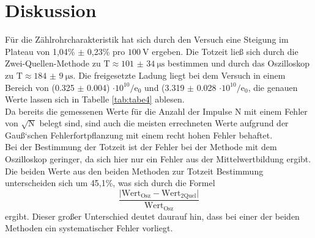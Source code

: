 \section{Diskussion}
\label{sec:Diskussion}
Für die Zählrohrcharakteristik hat sich durch den Versuch eine Steigung im Plateau von
1,04\% $\pm$ 0,23\% pro $\SI{100}{\volt}$ ergeben. Die Totzeit ließ sich durch die
Zwei-Quellen-Methode zu $\text{T} \approx \SI{101(34)}{\micro\second}$ bestimmen und durch
das Oszilloskop zu $\text{T} \approx \SI{184(9)}{\micro\second}$. Die freigesetzte Ladung
liegt bei dem Versuch in einem Bereich von (0.325 $\pm$ 0.004) $\cdot10^{10} / \text{e}_{0}$ und
(3.319 $\pm$ 0.028 $\cdot10^{10} / \text{e}_{0}$, die genauen Werte lassen sich in Tabelle \ref{tab:tabe4}
ablesen. \\
Da bereits die gemessenen Werte für die Anzahl der Impulse N mit einem Fehler
von $\sqrt{\text{N}}$ belegt sind, sind auch die meisten errechneten Werte aufgrund
der Gauß`schen Fehlerfortpflanzung mit einem recht hohen Fehler behaftet. \\
Bei der Bestimmung der Totzeit ist der Fehler bei der Methode mit dem Oszilloskop
geringer, da sich hier nur ein Fehler aus der Mittelwertbildung ergibt.
Die beiden Werte aus den beiden Methoden zur Totzeit Bestimmung unterscheiden sich um 45,1\%,
was sich durch die Formel
\begin{equation*}
  \frac{\lvert \text{Wert}_{\text{Osz}}-\text{Wert}_{\text{2Quel}}\rvert}{\text{Wert}_{\text{Osz}}}
  \label{eqn:abw}
\end{equation*}
ergibt. Dieser großer Unterschied deutet daurauf hin, dass bei einer der beiden Methoden
ein systematischer Fehler vorliegt.
